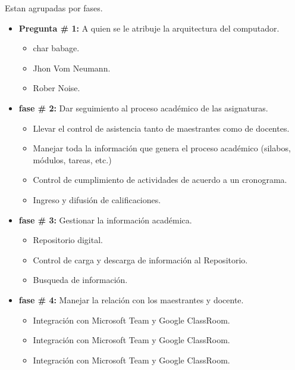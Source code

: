 \documentclass[a4paper,12pt,spanish]{article}
\begin{document}
\newpage
\restoregeometry




\begin{tcolorbox}[skin=widget,
boxrule=1mm,
coltitle=black,
colframe=blue!45!white,colback=blue!15!white,width=(1\linewidth),before=\hfill,after=\hfill,adjusted title={\textbf{Preguntas para el autocontrol}}]
Estan agrupadas por fases.  
\tcblower

\begin{itemize}
\item \textbf{Pregunta \# 1:} A quien se le atribuje la arquitectura del computador.
  \begin{itemize}
  \item  char babage.
  \item Jhon Vom Neumann.
  \item Rober Noise.
  \end{itemize}
\item \textbf{fase \# 2:} Dar seguimiento al proceso académico de las asignaturas.
  \begin{itemize}
  \item Llevar el control de asistencia tanto de maestrantes como de docentes.
  \item Manejar toda la información que genera el proceso académico (silabos, módulos, tareas, etc.)
  \item Control de cumplimiento de actividades de acuerdo a un cronograma.
  \item Ingreso y difusión de calificaciones.
  \end{itemize}
\item \textbf{fase \# 3:} Gestionar la información académica.
  \begin{itemize}
  \item Repositorio digital.
  \item Control de carga y descarga de información al Repositorio.
  \item Busqueda de información. 
  \end{itemize}
\item \textbf{fase \# 4:} Manejar la relación con los maestrantes y docente.
  \begin{itemize}
  \item Integración con Microsoft Team y Google ClassRoom.
  \item Integración con Microsoft Team y Google ClassRoom.
  \item Integración con Microsoft Team y Google ClassRoom.
  \end{itemize}
\end{itemize}

\end{tcolorbox}
\end{document}
